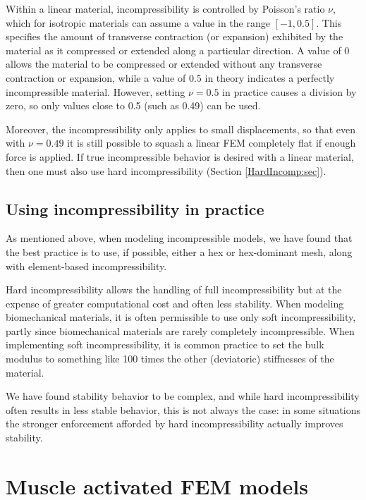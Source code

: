 Within a linear material, incompressibility is controlled by Poisson's
ratio $\nu$, which for isotropic materials can assume a value in the
range $[-1, 0.5]$. This specifies the amount of transverse contraction
(or expansion) exhibited by the material as it compressed or extended
along a particular direction. A value of $0$ allows the material to be
compressed or extended without any transverse contraction or
expansion, while a value of $0.5$ in theory indicates a perfectly
incompressible material. However, setting $\nu = 0.5$ in practice
causes a division by zero, so only values close to 0.5 (such as 0.49)
can be used. 

Moreover, the incompressibility only applies to small displacements,
so that even with $\nu = 0.49$ it is still possible to squash a linear
FEM completely flat if enough force is applied. If true incompressible
behavior is desired with a linear material, then one must also use
hard incompressibility (Section \ref{HardIncomp:sec}).

\subsection{Using incompressibility in practice}

As mentioned above, when modeling incompressible models, we have found
that the best practice is to use, if possible, either a hex or
hex-dominant mesh, along with element-based incompressibility.

Hard incompressibility allows the handling of full incompressibility
but at the expense of greater computational cost and often less
stability. When modeling biomechanical materials, it is often
permissible to use only soft incompressibility, partly since
biomechanical materials are rarely completely incompressible.  When
implementing soft incompressibility, it is common practice to set the
bulk modulus to something like 100 times the other (deviatoric)
stiffnesses of the material.

We have found stability behavior to be complex, and while hard
incompressibility often results in less stable behavior, this is not
always the case: in some situations the stronger enforcement afforded
by hard incompressibility actually improves stability.

\section{Muscle activated FEM models}
\label{sec:fem:muscle}

